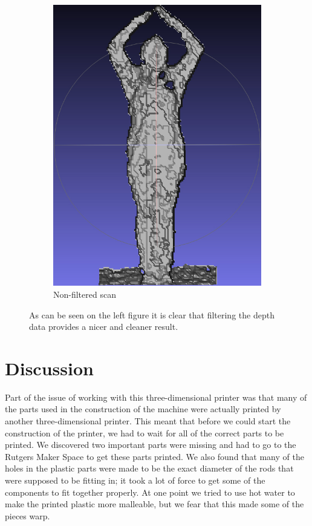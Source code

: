 \documentclass[pdftex,10.5pt]{report}
\begin{document}
\begin{figure}
\begin{subfigure}[H]{0.4\textwidth}
        \includegraphics[width=\textwidth]{figures/unfiltered}
        \caption{Non-filtered scan}
    \end{subfigure}
    \caption{
        As can be seen on the left figure it is clear that filtering the depth data provides a nicer and cleaner result.
    }
    \label{fig:cad}
\end{figure}

\section{Discussion}
Part of the issue of working with this three-dimensional printer was that many of the parts used in the construction of the machine were actually printed by another three-dimensional printer. This meant that before we could start the construction of the printer, we had to wait for all of the correct parts to be printed. We discovered two important parts were missing and had to go to the Rutgers Maker Space to get these parts printed. We also found that many of the holes in the plastic parts were made to be the exact diameter of the rods that were supposed to be fitting in; it took a lot of force to get some of the components to fit together properly. At one point we tried to use hot water to make the printed plastic more malleable, but we fear that this made some of the pieces warp.
\end{document}
